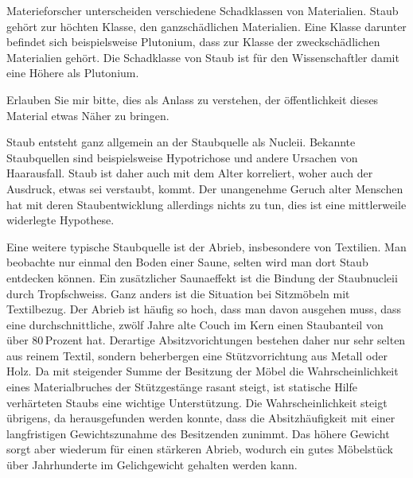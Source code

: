 \thispagestyle{empty}
\begin{center}
\end{center}
\vskip 2cm
{\Huge\color{farbe}\hfill{}}
\newpage
\lettrine[lines=2, lhang=.2, loversize=.25, lraise=0.05, findent=0.1em,
nindent=0em]{M}{}aterieforscher unterscheiden verschiedene Schadklassen von Materialien. Staub gehört zur höchten Klasse, den ganzschädlichen Materialien. Eine Klasse darunter befindet sich beispielsweise Plutonium, dass zur Klasse der zweckschädlichen Materialien gehört. Die Schadklasse von Staub ist für den Wissenschaftler damit eine Höhere als Plutonium.  

Erlauben Sie mir bitte, dies als Anlass zu verstehen, der öffentlichkeit dieses Material etwas Näher zu bringen. 

Staub entsteht ganz allgemein an der Staubquelle als Nucleii. Bekannte Staubquellen sind beispielsweise Hypotrichose und andere Ursachen von Haarausfall. Staub ist daher auch mit dem Alter korreliert, woher auch der Ausdruck, etwas sei verstaubt, kommt. Der unangenehme Geruch alter Menschen hat mit deren Staubentwicklung allerdings nichts zu tun, dies ist eine mittlerweile widerlegte Hypothese. 

Eine weitere typische Staubquelle ist der Abrieb, insbesondere von Textilien. Man beobachte nur einmal den Boden einer Saune, selten wird man dort Staub entdecken können. Ein zusätzlicher Saunaeffekt ist die Bindung der Staubnucleii durch Tropfschweiss. Ganz anders ist die Situation bei Sitzmöbeln mit Textilbezug. Der Abrieb ist häufig so hoch, dass man davon ausgehen muss, dass eine durchschnittliche, zwölf Jahre alte Couch im Kern einen Staubanteil von über 80\,Prozent hat. Derartige Absitzvorichtungen bestehen daher nur sehr selten aus reinem Textil, sondern beherbergen eine Stützvorrichtung aus Metall oder Holz. Da mit steigender Summe der Besitzung der Möbel die Wahrscheinlichkeit eines Materialbruches der Stützgestänge rasant steigt, ist statische Hilfe verhärteten Staubs eine wichtige Unterstützung. Die Wahrscheinlichkeit steigt übrigens, da herausgefunden werden konnte, dass die Absitzhäufigkeit mit einer langfristigen Gewichtszunahme des Besitzenden zunimmt. Das höhere Gewicht sorgt aber wiederum für einen stärkeren Abrieb, wodurch ein gutes Möbelstück über Jahrhunderte im Gelichgewicht gehalten werden kann.

